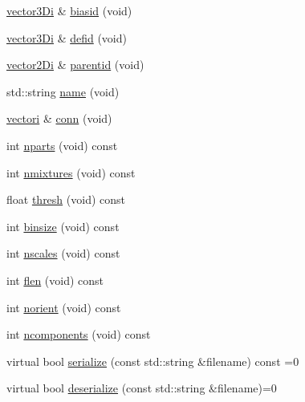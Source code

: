 \begin{DoxyCompactItemize}
\item 
\hyperlink{types_8hpp_a1f7c8ad00a53fb2d61b3656da9a6581d}{vector3\+Di} \& \hyperlink{classModel_a4088cf71d411e0cbbef2eb7c0861b039}{biasid} (void)
\item 
\hyperlink{types_8hpp_a1f7c8ad00a53fb2d61b3656da9a6581d}{vector3\+Di} \& \hyperlink{classModel_a2efd0f976fb014b3267281fd79172921}{defid} (void)
\item 
\hyperlink{types_8hpp_a93a5e2cfd40d1ff1f10d8bbf11884c41}{vector2\+Di} \& \hyperlink{classModel_a2a44477641549a9c8ebecfff9221bda9}{parentid} (void)
\item 
std\+::string \hyperlink{classModel_aeae6527ff13db7724c53c942029d882d}{name} (void)
\item 
\hyperlink{types_8hpp_a44529587d60e73bf0e689a82e5e70a55}{vectori} \& \hyperlink{classModel_a65d5e15900bc329b42acc7ce57c45628}{conn} (void)
\item 
int \hyperlink{classModel_aadbe1db9da272e3c7925f14c10143360}{nparts} (void) const 
\item 
int \hyperlink{classModel_a86676b7fdc842393897b11ce8a7d7623}{nmixtures} (void) const 
\item 
float \hyperlink{classModel_a474739b5b87ebfc7342d10124dfd59b6}{thresh} (void) const 
\item 
int \hyperlink{classModel_a93d5e6030b6ea9ffe155b459d9e58585}{binsize} (void) const 
\item 
int \hyperlink{classModel_a3de9632d7c459c2d7ea961be84005921}{nscales} (void) const 
\item 
int \hyperlink{classModel_ad9ff4f0d1dd752dd96f6ff4a47e3486d}{flen} (void) const 
\item 
int \hyperlink{classModel_ab64488cd01aa451323bf1e30603fbc73}{norient} (void) const 
\item 
int \hyperlink{classModel_acaee5d575cfdb39a4a6ebc3b765a88bc}{ncomponents} (void) const 
\item 
virtual bool \hyperlink{classModel_a952f21d72d87aa30387ea6e5c1d603fd}{serialize} (const std\+::string \&filename) const =0
\item 
virtual bool \hyperlink{classModel_a2fc5d668c4930e8172e1a1460a8e6b46}{deserialize} (const std\+::string \&filename)=0
\end{DoxyCompactItemize}
